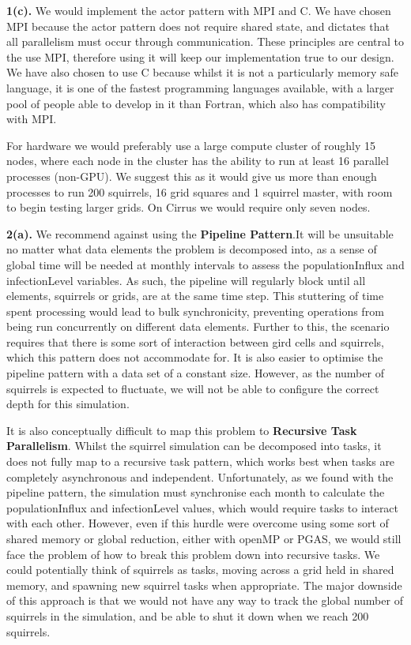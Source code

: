 \documentclass[conference]{IEEEtran}
\begin{document}
\noindent\textbf{1(c).} \newline
We would implement the actor pattern with MPI and C. We have chosen MPI because the actor pattern does not require shared state, and dictates that all parallelism must occur through communication. These principles are central to the use MPI, therefore using it will keep our implementation true to our design. We have also chosen to use C because whilst it is not a particularly memory safe language, it is one of the fastest programming languages available, with a larger pool of people able to develop in it than Fortran, which also has compatibility with MPI.

For hardware we would preferably use a large compute cluster of roughly 15 nodes, where each node in the cluster has the ability to run at least 16 parallel processes (non-GPU). We suggest this as it would give us more than enough processes to run 200 squirrels, 16 grid squares and 1 squirrel master, with room to begin testing larger grids. On Cirrus we would require only seven nodes. \newline

\noindent\textbf{2(a).} \newline
We recommend against using the \textbf{Pipeline Pattern}.It will be unsuitable no matter what data elements the problem is decomposed into, as a sense of global time will be needed at monthly intervals to assess the populationInflux and infectionLevel variables. As such, the pipeline will regularly block until all elements, squirrels or grids, are at the same time step. This stuttering of time spent processing would lead to bulk synchronicity, preventing operations from being run concurrently on different data elements. Further to this, the scenario requires that there is some sort of interaction between gird cells and squirrels, which this pattern does not accommodate for. It is also easier to optimise the pipeline pattern with a data set of a constant size. However, as the number of squirrels is expected to fluctuate, we will not be able to configure the correct depth for this simulation.

It is also conceptually difficult to map this problem to \textbf{Recursive Task Parallelism}. Whilst the squirrel simulation can be decomposed into tasks, it does not fully map to a recursive task pattern, which works best when tasks are completely asynchronous and independent. Unfortunately, as we found with the pipeline pattern, the simulation must synchronise each month to calculate the populationInflux and infectionLevel values, which would require tasks to interact with each other. However, even if this hurdle were overcome using some sort of shared memory or global reduction, either with openMP or PGAS, we would still face the problem of how to break this problem down into recursive tasks.  We could potentially think of squirrels as tasks, moving across a grid held in shared memory, and spawning new squirrel tasks when appropriate. The major downside of this approach is that we would not have any way to track the global number of squirrels in the simulation, and be able to shut it down when we reach 200 squirrels. \newline
\end{document}
